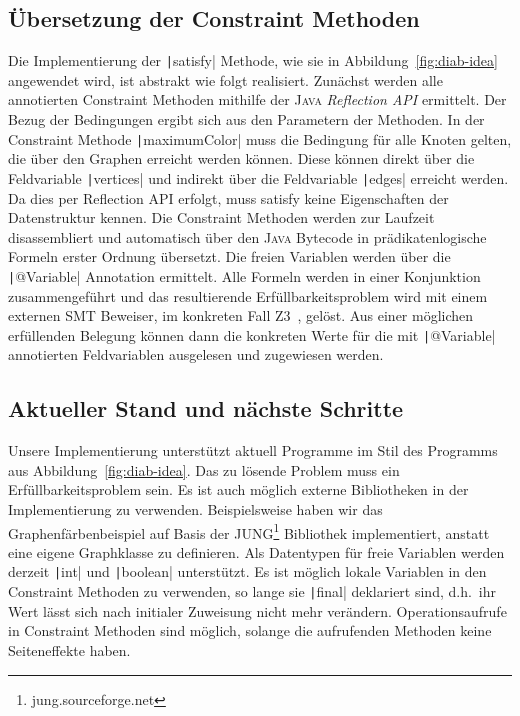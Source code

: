 \documentclass[a4paper,fontsize=12pt,headings=small,captions=tableheading,%
numbers=endperiod,abstracton,pdftex]{scrartcl}
\begin{document}
\subsection{Übersetzung der Constraint Methoden}
Die Implementierung der \texttt|satisfy| Methode, wie sie in
Abbildung~\ref{fig:diab-idea} angewendet wird, ist abstrakt wie folgt
realisiert.  Zunächst werden alle annotierten Constraint Methoden mithilfe der
\textsc{Java} \emph{Reflection API} ermittelt.  Der Bezug der Bedingungen ergibt
sich aus den Parametern der Methoden.  In der Constraint Methode
\texttt|maximumColor| muss die Bedingung für alle Knoten gelten, die
über den Graphen erreicht werden können.  Diese können direkt über die
Feldvariable \texttt|vertices| und indirekt über die Feldvariable
\texttt|edges| erreicht werden.  Da dies per Reflection API erfolgt,
muss satisfy keine Eigenschaften der Datenstruktur kennen.  Die Constraint
Methoden werden zur Laufzeit dis\-as\-sem\-bliert und automatisch über den
\textsc{Java} Bytecode in prädikatenlogische Formeln erster Ordnung übersetzt.
Die freien Variablen werden über die \texttt|@Variable| Annotation
ermittelt.  Alle Formeln werden in einer Konjunktion zusammengeführt und das
resultierende Erfüllbarkeitsproblem wird mit einem externen SMT Beweiser, im
konkreten Fall Z3~\cite{MB:08}, gelöst.  Aus einer möglichen erfüllenden
Belegung können dann die konkreten Werte für die mit
\texttt|@Variable| annotierten Feldvariablen ausgelesen und zugewiesen
werden.

\subsection{Aktueller Stand und nächste Schritte}
Unsere Implementierung unterstützt aktuell Programme im Stil des Programms aus
Abbildung~\ref{fig:diab-idea}.  Das zu lösende Problem muss ein
Erfüllbarkeitsproblem sein.  Es ist auch möglich externe Bibliotheken in der
Implementierung zu verwenden.  Beispielsweise haben wir das
Graphenfärbenbeispiel auf Basis der JUNG\footnote{jung.sourceforge.net}
Bibliothek implementiert, anstatt eine eigene Graphklasse zu definieren.  Als
Datentypen für freie Variablen werden derzeit \texttt|int| und
\texttt|boolean| unterstützt.  Es ist möglich lokale Variablen in den
Constraint Methoden zu verwenden, so lange sie \texttt|final|
deklariert sind, d.h.~ihr Wert lässt sich nach initialer Zuweisung nicht mehr
verändern.  Operationsaufrufe in Constraint Methoden sind möglich, solange die
aufrufenden Methoden keine Seiteneffekte haben.
\end{document}
